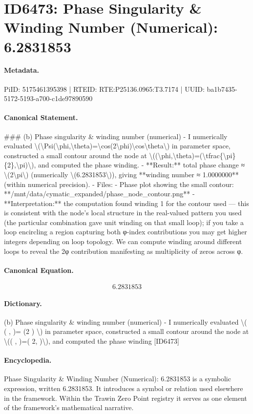 \section*{ID6473: Phase Singularity \& Winding Number (Numerical): 6.2831853}
\paragraph{Metadata.}
PiID: 5175461395398 | RTEID: RTE:P25136.0965:T3.7174 | UUID: ba1b7435-5172-5193-a700-c1de97890590

\paragraph{Canonical Statement.}
\#\#\# (b) Phase singularity \& winding number (numerical) - I numerically evaluated \textbackslash{}(\textbackslash{}Psi(\textbackslash{}phi,\textbackslash{}theta)=\textbackslash{}cos(2\textbackslash{}phi)\textbackslash{}cos\textbackslash{}theta\textbackslash{}) in parameter space, constructed a small contour around the node at \textbackslash{}((\textbackslash{}phi,\textbackslash{}theta)=(\textbackslash{}tfrac\{\textbackslash{}pi\}\{2\},\textbackslash{}pi)\textbackslash{}), and computed the phase winding. - **Result:** total phase change ≈ \textbackslash{}(2\textbackslash{}pi\textbackslash{}) (numerically \textbackslash{}(6.2831853\textbackslash{})), giving **winding number ≈ 1.0000000** (within numerical precision). - Files: - Phase plot showing the small contour: **/mnt/data/cymatic\_expanded/phase\_node\_contour.png** - **Interpretation:** the computation found winding 1 for the contour used — this is consistent with the node’s local structure in the real-valued pattern you used (the particular combination gave unit winding on that small loop); if you take a loop encircling a region capturing both φ-index contributions you may get higher integers depending on loop topology. We can compute winding around different loops to reveal the 2φ contribution manifesting as multiplicity of zeros across φ.

\paragraph{Canonical Equation.}
\[
6.2831853
\]

\paragraph{Dictionary.}
(b) Phase singularity \& winding number (numerical) - I numerically evaluated \textbackslash{}( ( , )= (2 ) \textbackslash{}) in parameter space, constructed a small contour around the node at \textbackslash{}(( , )=( 2, )\textbackslash{}), and computed the phase winding [ID6473]

\paragraph{Encyclopedia.}
Phase Singularity \& Winding Number (Numerical): 6.2831853 is a symbolic expression, written 6.2831853. It introduces a symbol or relation used elsewhere in the framework. Within the Trawin Zero Point registry it serves as one element of the framework's mathematical narrative.
